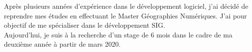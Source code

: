 \documentclass[a4paper]{limecv}
\begin{document}
\begin{cvSidebar}

  \begin{cvProfile}
	Après plusieurs années d'expérience dans le développement logiciel, j'ai décidé de reprendre mes études en effectuant le Master Géographies Numériques. J'ai pour objectif de me spécialiser dans le développement SIG.\\Aujourd'hui, je suis à la recherche d'un stage de 6 mois dans le cadre de ma deuxième année à partir de mars 2020.
  \end{cvProfile}
  
  \begin{cvContact}
  \end{cvContact}
  

\end{cvSidebar}
\end{document}
